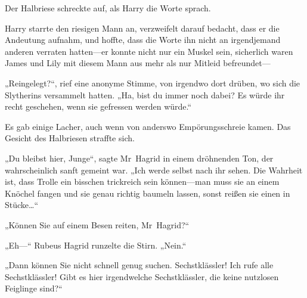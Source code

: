 Der Halbriese schreckte auf, als Harry die Worte sprach.

Harry starrte den riesigen Mann an, verzweifelt darauf bedacht, dass er die Andeutung aufnahm, und hoffte, dass die Worte ihn nicht an irgendjemand anderen verraten hatten—er konnte nicht nur ein Muskel sein, sicherlich waren James und Lily mit diesem Mann aus mehr als nur Mitleid befreundet—

„Reingelegt?“, rief eine anonyme Stimme, von irgendwo dort drüben, wo sich die Slytherins versammelt hatten. „Ha, bist du immer noch dabei? Es würde ihr recht geschehen, wenn sie gefressen werden würde.“

Es gab einige Lacher, auch wenn von anderswo Empörungsschreie kamen. Das Gesicht des Halbriesen straffte sich.

„Du bleibst hier, Junge“, sagte Mr~Hagrid in einem dröhnenden Ton, der wahrscheinlich sanft gemeint war. „Ich werde selbst nach ihr sehen. Die Wahrheit ist, dass Trolle ein bisschen trickreich sein können—man muss sie an einem Knöchel fangen und sie genau richtig baumeln lassen, sonst reißen sie einen in Stücke…“

„Können Sie auf einem Besen reiten, Mr~Hagrid?“

„Eh—“ Rubeus Hagrid runzelte die Stirn. „Nein.“

„Dann können Sie nicht schnell genug suchen. Sechstklässler! Ich rufe alle Sechstklässler! Gibt es hier irgendwelche Sechstklässler, die keine nutzlosen Feiglinge sind?“

